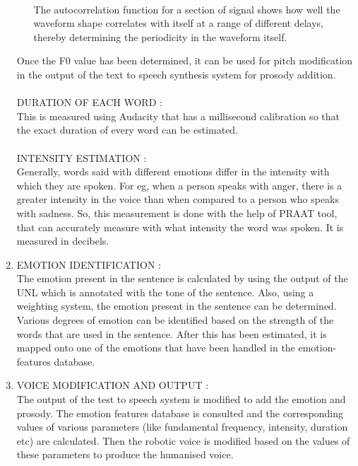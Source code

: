 \documentclass{article}
\begin{document}
\begin{enumerate}
\begin{itemize}
\\The autocorrelation function for a section of signal shows how well the waveform shape correlates with itself at a range of different delays, thereby determining the periodicity in the waveform itself.
\end{itemize}
Once the F0 value has been determined, it can be used for pitch modification in the output of the text to speech synthesis system for prosody addition.\\
\\DURATION OF EACH WORD :
\\This is measured using Audacity that has a millisecond calibration so that the exact duration of every word can be estimated.\\
\\INTENSITY ESTIMATION :
\\Generally, words said with different emotions differ in the intensity with which they are spoken. For eg, when a person speaks with anger, there is a greater intensity in the voice than when compared to a person who speaks with sadness. So, this measurement is done with the help of PRAAT tool, that can accurately measure with what intensity the word was spoken. It is measured in decibels. 

\item EMOTION IDENTIFICATION :
\\The emotion present in the sentence is calculated by using the output of the UNL which is annotated with the tone of the sentence. Also, using a weighting system, the emotion present in the sentence can be determined. Various degrees of emotion can be identified based on the strength of the words that are used in the sentence. After this has been estimated, it is mapped onto one of the emotions that have been handled in the emotion-features database.

\item VOICE MODIFICATION AND OUTPUT :
\\The output of the test to speech system is modified to add the emotion and prosody. The emotion features database is consulted and the corresponding values of various parameters (like fundamental frequency, intensity, duration etc) are calculated. Then the robotic voice is modified based on the values of these parameters to produce the humanised voice. 
\end{enumerate}
\end{document}
